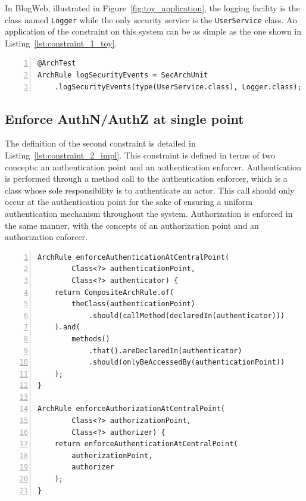 In BlogWeb, illustrated in Figure~\ref{fig:toy_application}, the logging facility is the class named \texttt{Logger} while the only security service is the \texttt{UserService} class. An application of the constraint on this system can be as simple as the one shown in Listing~\ref{lst:constraint_1_toy}.

\begin{minipage}{\linewidth}
\begin{lstlisting}[caption={Application of constraint 1 to BlogWeb.}, captionpos=b, label=lst:constraint_1_toy, numbers=left]
@ArchTest
ArchRule logSecurityEvents = SecArchUnit
    .logSecurityEvents(type(UserService.class), Logger.class);
\end{lstlisting}
\end{minipage}

\subsection{Enforce AuthN/AuthZ at single point}
The definition of the second constraint is detailed in Listing~\ref{lst:constraint_2_impl}.
This constraint is defined in terms of two concepts: an authentication point and an authentication enforcer. Authentication is performed through a method call to the authentication enforcer, which is a class whose sole responsibility is to authenticate an actor. This call should only occur at the authentication point for the sake of ensuring a uniform authentication mechanism throughout the system. Authorization is enforced in the same manner, with the concepts of an authorization point and an authorization enforcer.

\begin{minipage}{\linewidth}
\begin{lstlisting}[caption={Rule definitions for constraint 2.}, captionpos=b, label=lst:constraint_2_impl, numbers=left]
ArchRule enforceAuthenticationAtCentralPoint(
        Class<?> authenticationPoint,
        Class<?> authenticator) {
    return CompositeArchRule.of(
        theClass(authenticationPoint)
            .should(callMethod(declaredIn(authenticator)))
    ).and(
        methods()
            .that().areDeclaredIn(authenticator)
            .should(onlyBeAccessedBy(authenticationPoint))
    );
}

ArchRule enforceAuthorizationAtCentralPoint(
        Class<?> authorizationPoint,
        Class<?> authorizer) {
    return enforceAuthenticationAtCentralPoint(
        authorizationPoint,
        authorizer
    );
}
\end{lstlisting}
\end{minipage}

